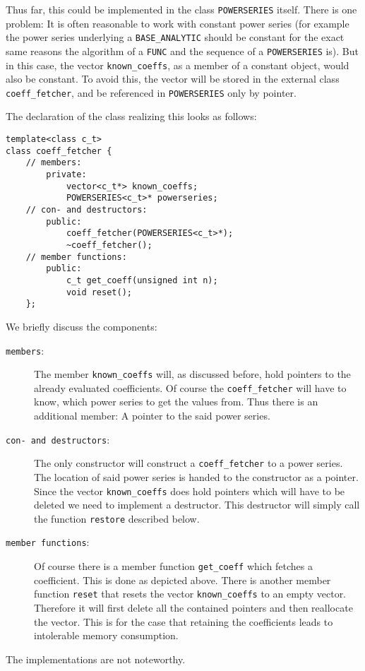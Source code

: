 \documentclass{article}
\newcommand{\code}[1]{\texttt{#1}}
\newcommand{\func}[1]{\texttt{#1}}
\begin{document}
Thus far, this could be implemented in the class \func{POWERSERIES} itself. There is one problem: It is often reasonable to work with constant power series (for example the power series underlying a \func{BASE\_ANALYTIC} should be constant for the exact same reasons the algorithm of a \func{FUNC} and the sequence of a \func{POWERSERIES} is). But in this case, the vector \code{known\_coeffs}, as a member of a constant object, would also be constant. To avoid this, the vector will be stored in the external class \func{coeff\_fetcher}, and be referenced in \func{POWERSERIES} only by pointer.

The declaration of the class realizing this looks as follows:
\begin{lstlisting}
template<class c_t>
class coeff_fetcher {
	// members:
		private:
			vector<c_t*> known_coeffs;
			POWERSERIES<c_t>* powerseries;
	// con- and destructors:
		public:
			coeff_fetcher(POWERSERIES<c_t>*);
			~coeff_fetcher();
	// member functions:
		public:
			c_t get_coeff(unsigned int n);
			void reset();
	};
\end{lstlisting}
We briefly discuss the components:
\begin{description}
\item[\code{members}:] The member \code{known\_coeffs} will, as discussed before, hold pointers to the already evaluated coefficients. Of course the \code{coeff\_fetcher} will have to know, which power series to get the values from. Thus there is an additional member: A pointer to the said power series.
\item[\code{con- and destructors}:] The only constructor will construct a \code{coeff\_fetcher} to a power series. The location of said power series is handed to the constructor as a pointer. Since the vector \code{known\_coeffs} does hold pointers which will have to be deleted we need to implement a destructor. This destructor will simply call the function \code{restore} described below.
\item[\code{member functions}:] Of course there is a member function \code{get\_coeff} which fetches a coefficient. This is done as depicted above. There is another member function \code{reset} that resets the vector \code{known\_coeffs} to an empty vector. Therefore it will first delete all the contained pointers and then reallocate the vector. This is for the case that retaining the coefficients leads to intolerable memory consumption.
\end{description}
The implementations are not noteworthy.
\end{document}
